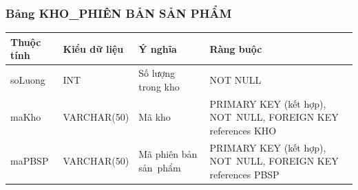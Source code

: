 \documentclass[a4paper,12pt]{report}
\begin{document}
\subsubsection{Bảng KHO\_PHIÊN BẢN SẢN PHẨM}
\noindent
\begin{center}
    \begin{tabular}{|>{\centering\arraybackslash}p{3cm}|
        >{\centering\arraybackslash}p{4cm}|
        >{\centering\arraybackslash}p{4cm}|
        >{\centering\arraybackslash}p{4cm}|}
        \hline
        \textbf{Thuộc tính}                                                                                                               &
        \textbf{Kiểu dữ liệu}                                                                                                                             &
        \textbf{Ý nghĩa}                                                                                                 &
        \textbf{Ràng buộc}                                                                                                         \\
        \hline
        soLuong &  INT  & Số lượng trong kho & NOT NULL \\
        \hline
        maKho &  VARCHAR(50)  & Mã kho & PRIMARY KEY (kết hợp), NOT~NULL, FOREIGN KEY references KHO \\                                                                                                                          
        \hline
        maPBSP &  VARCHAR(50)  & Mã phiên bản sản~phẩm & PRIMARY KEY (kết hợp), NOT~NULL, FOREIGN KEY references PBSP \\
        \hline
    \end{tabular}
\end{center}
\end{document}
